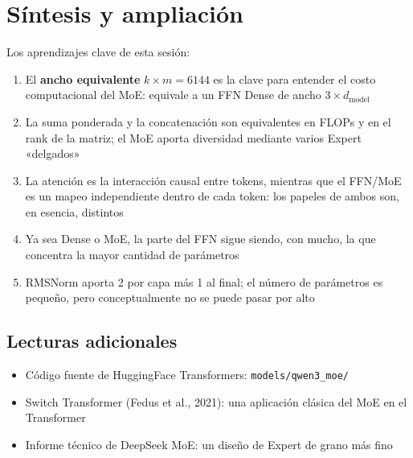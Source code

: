 \section{Síntesis y ampliación}

Los aprendizajes clave de esta sesión:

\begin{enumerate}
  \item El \textbf{ancho equivalente} $k \times m = 6144$ es la clave para entender el costo computacional del MoE: equivale a un FFN Dense de ancho $3 \times d_{\text{model}}$
  \item La suma ponderada y la concatenación son equivalentes en FLOPs y en el rank de la matriz; el MoE aporta diversidad mediante varios Expert «delgados»
  \item La atención es la interacción causal entre tokens, mientras que el FFN/MoE es un mapeo independiente dentro de cada token: los papeles de ambos son, en esencia, distintos
  \item Ya sea Dense o MoE, la parte del FFN sigue siendo, con mucho, la que concentra la mayor cantidad de parámetros
  \item RMSNorm aporta 2 por capa más 1 al final; el número de parámetros es pequeño, pero conceptualmente no se puede pasar por alto
\end{enumerate}

\subsection{Lecturas adicionales}

\begin{itemize}
  \item Código fuente de HuggingFace Transformers: \texttt{models/qwen3\_moe/}
  \item Switch Transformer (Fedus et al., 2021): una aplicación clásica del MoE en el Transformer
  \item Informe técnico de DeepSeek MoE: un diseño de Expert de grano más fino
\end{itemize}


